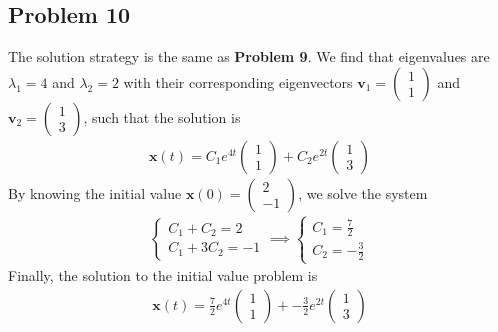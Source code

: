 \documentclass[12pt]{article}
\begin{document}
\subsection*{Problem 10}
\label{sec:org0826278}
The solution strategy is the same as \textbf{Problem 9}. We find that eigenvalues are
\(\lambda_1 = 4\) and \(\lambda_2 = 2\) with their corresponding eigenvectors
\(\mathbf{v}_1 = \begin{pmatrix}1 \\ 1 \end{pmatrix}\) and
\(\mathbf{v}_2 = \begin{pmatrix}1 \\ 3 \end{pmatrix}\), such that the solution
is
\begin{align*}
        \mathbf{x}(t) = C_1 e^{4t} \begin{pmatrix}1 \\ 1 \end{pmatrix} +
        C_2 e^{2t} \begin{pmatrix}1 \\ 3 \end{pmatrix}
\end{align*}
By knowing the initial value
\(\mathbf{x}(0) = \begin{pmatrix} 2 \\ -1 \end{pmatrix}\), we solve the system
\begin{align*}
        \begin{cases}
                C_1 + C_2 = 2 \\
                C_1 + 3 C_2 = -1
        \end{cases}
        \implies
        \begin{cases}
                C_1 = \frac{7}{2} \\
                C_2 = -\frac{3}{2}
        \end{cases}
\end{align*}
Finally, the solution to the initial value problem is
\begin{align*}
        \mathbf{x}(t) = \frac{7}{2} e^{4t} \begin{pmatrix}1 \\ 1 \end{pmatrix} +
        - \frac{3}{2} e^{2t} \begin{pmatrix}1 \\ 3 \end{pmatrix}
\end{align*}
\end{document}
